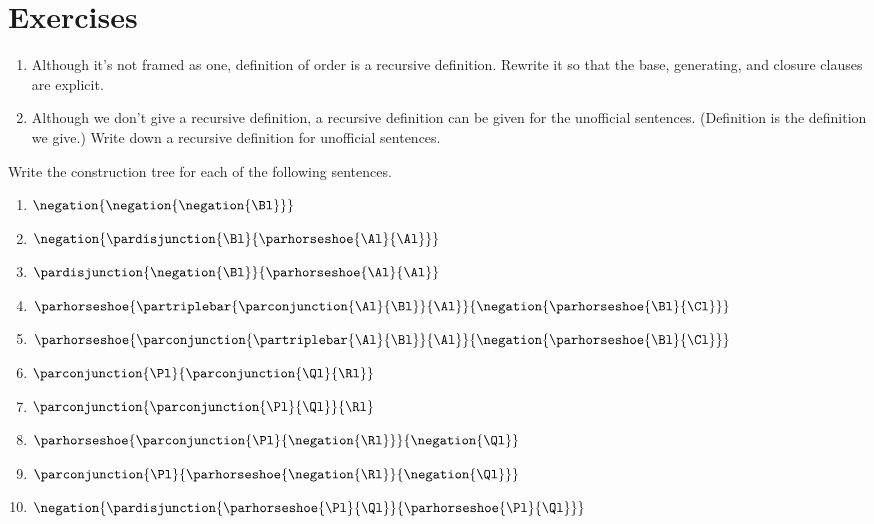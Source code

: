 \section{Exercises}


\begin{enumerate}
\item Although it's not framed as one, definition  of order is a recursive definition. Rewrite it so that the base, generating, and closure clauses are explicit. 
\item Although we don't give a recursive definition, a recursive definition can be given for the unofficial \GSL{} sentences. (Definition  is the definition we give.) Write down a recursive definition for unofficial \GSL{} sentences.
\end{enumerate}

Write the construction tree for each of the following \GSL{} sentences.
\begin{multicols}{2}
\begin{enumerate}
\item $\negation{\negation{\negation{\Bl}}}$
\item $\negation{\pardisjunction{\Bl}{\parhorseshoe{\Al}{\Al}}}$
\item $\pardisjunction{\negation{\Bl}}{\parhorseshoe{\Al}{\Al}}$
\item $\parhorseshoe{\partriplebar{\parconjunction{\Al}{\Bl}}{\Al}}{\negation{\parhorseshoe{\Bl}{\Cl}}}$
\item $\parhorseshoe{\parconjunction{\partriplebar{\Al}{\Bl}}{\Al}}{\negation{\parhorseshoe{\Bl}{\Cl}}}$
\item $\parconjunction{\Pl}{\parconjunction{\Ql}{\Rl}}$
\item $\parconjunction{\parconjunction{\Pl}{\Ql}}{\Rl}$
\item $\parhorseshoe{\parconjunction{\Pl}{\negation{\Rl}}}{\negation{\Ql}}$
\item $\parconjunction{\Pl}{\parhorseshoe{\negation{\Rl}}{\negation{\Ql}}}$
\item $\negation{\pardisjunction{\parhorseshoe{\Pl}{\Ql}}{\parhorseshoe{\Pl}{\Ql}}}$
\end{enumerate}
\end{multicols}

